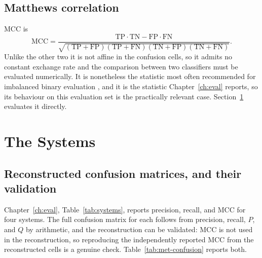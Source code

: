 \subsection{Matthews correlation}

MCC \citep{matthews1975mcc} is
\[
\mathrm{MCC} = \frac{\mathrm{TP}\cdot\mathrm{TN} -
\mathrm{FP}\cdot\mathrm{FN}}
{\sqrt{(\mathrm{TP}{+}\mathrm{FP})(\mathrm{TP}{+}\mathrm{FN})
(\mathrm{TN}{+}\mathrm{FP})(\mathrm{TN}{+}\mathrm{FN})}} .
\]
Unlike the other two it is not affine in the confusion cells, so it admits no
constant exchange rate and the comparison between two classifiers must be
evaluated numerically. It is nonetheless the statistic most often recommended
for imbalanced binary evaluation \citep{chicco2020mcc,powers2011evaluation}, and
it is the statistic Chapter~\ref{ch:eval} reports, so its behaviour on this
evaluation set is the practically relevant case.
Section~\ref{sec:met-systems} evaluates it directly.

\section{The Systems}
\label{sec:met-systems}

\subsection{Reconstructed confusion matrices, and their validation}

Chapter~\ref{ch:eval}, Table~\ref{tab:systems}, reports precision, recall, and
MCC for four systems. The full confusion matrix for each follows from precision,
recall, $P$, and $Q$ by arithmetic, and the reconstruction can be validated:
MCC is not used in the reconstruction, so reproducing the independently reported
MCC from the reconstructed cells is a genuine check.
Table~\ref{tab:met-confusion} reports both.

